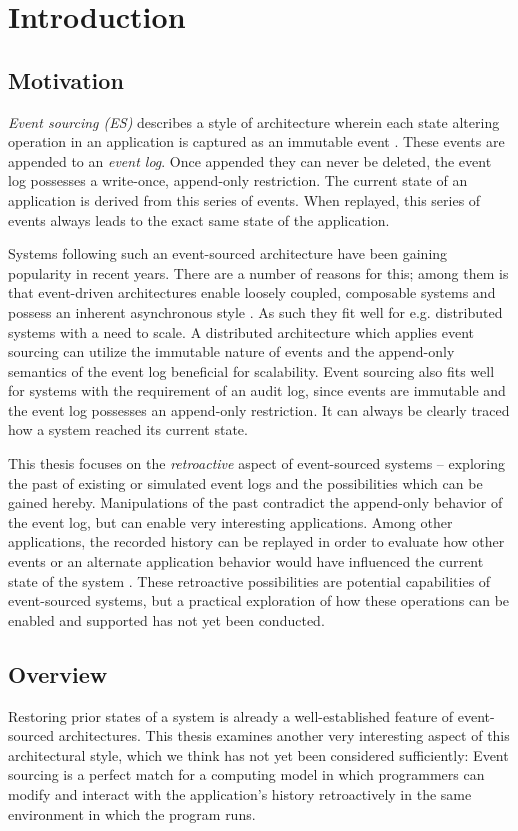 \chapter{Introduction}
\label{chp:introduction}

\section{Motivation}

\emph{Event sourcing (ES)} describes a style of architecture wherein each 
state altering operation in an application is captured as an immutable event 
\cite{Fowler2005}.
These events are appended to an \emph{event log}. Once appended they can
never be deleted, the event log possesses a write-once, append-only restriction.
The current state of an application is derived from this series of events.
When replayed, this series of events always leads to the exact same state 
of the application. 

Systems following such an event-sourced architecture have been gaining
popularity in recent years. There are a number of reasons for this; among
them is that event-driven architectures enable loosely coupled, composable
systems and possess an inherent asynchronous style \cite{Hohpe2006}.
As such they fit well for e.g. distributed systems with a need to scale.
%
A distributed architecture which applies event sourcing can utilize the 
immutable nature of events and the append-only semantics of the event log 
beneficial for scalability.
Event sourcing also fits well for systems with the requirement of an audit 
log, since events are immutable and the event log possesses an append-only 
restriction. It can always be clearly traced how a system reached its 
current state. 

This thesis focuses on the \emph{retroactive} aspect of event-sourced
systems -- exploring the past of existing or simulated event logs and the 
possibilities which can be gained hereby. 
Manipulations of the past contradict the append-only behavior of the event 
log, but can enable very interesting applications. Among other applications, 
the recorded history can be replayed in order to evaluate how other events 
or an alternate application behavior would have influenced the current state 
of the system \cite{Erb2014}.
These retroactive possibilities are potential capabilities of event-sourced 
systems, but a practical exploration of how these operations can be enabled 
and supported has not yet been conducted.

\section{Overview}
Restoring prior states of a system is already a well-established feature of 
event-sourced architectures. This thesis examines another very interesting 
aspect of this architectural style, which we think has not yet been considered 
sufficiently: 
%
Event sourcing is a perfect match for a computing model in which programmers 
can modify and interact with the application's history retroactively in the 
same environment in which the program runs. 


